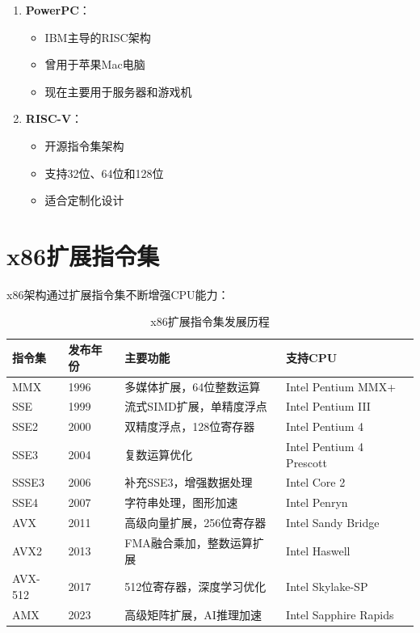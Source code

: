 \documentclass[12pt,UTF8]{ctexbook}
\begin{document}
\begin{enumerate}
    \item \textbf{PowerPC}：
    \begin{itemize}[leftmargin=2em]
        \item IBM主导的RISC架构
        \item 曾用于苹果Mac电脑
        \item 现在主要用于服务器和游戏机
    \end{itemize}
    
    \item \textbf{RISC-V}：
    \begin{itemize}[leftmargin=2em]
        \item 开源指令集架构
        \item 支持32位、64位和128位
        \item 适合定制化设计
    \end{itemize}
\end{enumerate}

\section{x86扩展指令集}

x86架构通过扩展指令集不断增强CPU能力：

\begin{table}[H]
    \centering
    \begin{tabular}{|p{2cm}|p{3cm}|p{6cm}|p{3cm}|}
        \hline
        \textbf{指令集} & \textbf{发布年份} & \textbf{主要功能} & \textbf{支持CPU} \\
        \hline
        MMX & 1996 & 多媒体扩展，64位整数运算 & Intel Pentium MMX+ \\
        \hline
        SSE & 1999 & 流式SIMD扩展，单精度浮点 & Intel Pentium III \\
        \hline
        SSE2 & 2000 & 双精度浮点，128位寄存器 & Intel Pentium 4 \\
        \hline
        SSE3 & 2004 & 复数运算优化 & Intel Pentium 4 Prescott \\
        \hline
        SSSE3 & 2006 & 补充SSE3，增强数据处理 & Intel Core 2 \\
        \hline
        SSE4 & 2007 & 字符串处理，图形加速 & Intel Penryn \\
        \hline
        AVX & 2011 & 高级向量扩展，256位寄存器 & Intel Sandy Bridge \\
        \hline
        AVX2 & 2013 & FMA融合乘加，整数运算扩展 & Intel Haswell \\
        \hline
        AVX-512 & 2017 & 512位寄存器，深度学习优化 & Intel Skylake-SP \\
        \hline
        AMX & 2023 & 高级矩阵扩展，AI推理加速 & Intel Sapphire Rapids \\
        \hline
    \end{tabular}
    \caption{x86扩展指令集发展历程}
    \label{tab:x86_extensions}
\end{table}
\end{document}
